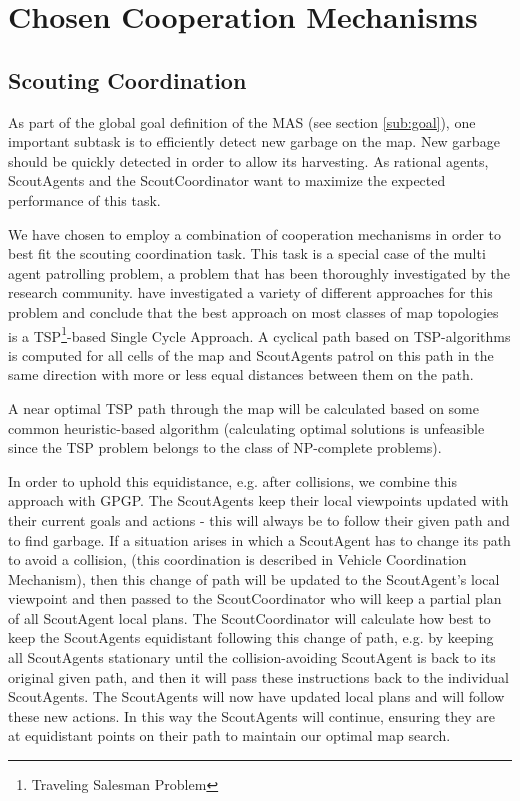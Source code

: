 \section{Chosen Cooperation Mechanisms}
\label{sec:chosCoop}


\subsection{Scouting Coordination}

As part of the global goal definition of the MAS (see section \ref{sub:goal}), one important subtask is to efficiently detect new garbage on the map. New garbage should be quickly detected in order to allow its harvesting. As rational agents, ScoutAgents and the ScoutCoordinator want to maximize the expected performance of this task.

We have chosen to employ a combination of cooperation mechanisms in order to best fit the scouting coordination task. This task is a special case of the multi agent patrolling problem, a problem that has been thoroughly investigated by the research community. \cite{Almeida2004} have investigated a variety of different approaches for this problem and conclude that the best approach on most classes of map topologies is a TSP\footnote{Traveling Salesman Problem}-based Single Cycle Approach. A cyclical path based on TSP-algorithms is computed for all cells of the map and ScoutAgents patrol on this path in the same direction with more or less equal distances between them on the path. 

A near optimal TSP path through the map will be calculated based on some common heuristic-based algorithm (calculating optimal solutions is unfeasible since the TSP problem belongs to the class of NP-complete problems).

In order to uphold this equidistance, e.g. after collisions, we combine this approach with GPGP. The ScoutAgents keep their local viewpoints updated with their current goals and actions - this will always be to follow their given path and to find garbage. If a situation arises in which a ScoutAgent has to change its path to avoid a collision, (this coordination is described in Vehicle Coordination Mechanism), then this change of path will be updated to the ScoutAgent’s local viewpoint and then passed to the ScoutCoordinator who will keep a partial plan of all ScoutAgent local plans. The ScoutCoordinator will calculate how best to keep the ScoutAgents equidistant following this change of path, e.g. by keeping all ScoutAgents stationary until the collision-avoiding ScoutAgent is back to its original given path, and then it will pass these instructions back to the individual ScoutAgents. The ScoutAgents will now have updated local plans and will follow these new actions. In this way the ScoutAgents will continue, ensuring they are at equidistant points on their path to maintain our optimal map search. 


